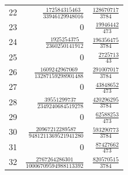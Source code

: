 \begin{longtable}{rrr}
22 & $\frac{172584315463}{33946129948016}$ & $\frac{128670717}{3784}$\\
23 & $0$ & $\frac{19946442}{473}$\\
24 & $\frac{1925254375}{2360250141912}$ & $\frac{196356475}{3784}$\\
25 & $0$ & $\frac{2725713}{43}$\\
26 & $\frac{1609242967069}{13287159298901488}$ & $\frac{291007017}{3784}$\\
27 & $0$ & $\frac{43848652}{473}$\\
28 & $\frac{39551299737}{2349240684519278}$ & $\frac{420296295}{3784}$\\
29 & $0$ & $\frac{62588253}{473}$\\
30 & $\frac{20967212289587}{9481211369521941280}$ & $\frac{593290773}{3784}$\\
31 & $0$ & $\frac{87427662}{473}$\\
32 & $\frac{2767264286301}{10006709594988113392}$ & $\frac{820570515}{3784}$\\
\end{longtable}
\endgroup
